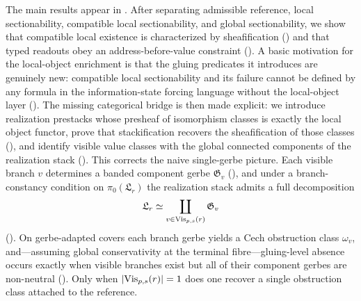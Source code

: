 The main results appear in . After separating admissible reference, local sectionability, compatible local sectionability, and global sectionability, we show that compatible local existence is characterized by sheafification () and that typed readouts obey an address-before-value constraint (). A basic motivation for the local-object enrichment is that the gluing predicates it introduces are genuinely new: compatible local sectionability and its failure cannot be defined by any formula in the information-state forcing language without the local-object layer (). The missing categorical bridge is then made explicit: we introduce realization prestacks whose presheaf of isomorphism classes is exactly the local object functor, prove that stackification recovers the sheafification of those classes (), and identify visible value classes with the global connected components of the realization stack (). This corrects the naive single-gerbe picture. Each visible branch $v$ determines a banded component gerbe $\mathfrak G_v$ (), and under a branch-constancy condition on $\pi_0(\mathfrak L_r)$ the realization stack admits a full decomposition
\[
\mathfrak L_r\simeq \coprod_{v\in \mathrm{Vis}_{p,s}(r)} \mathfrak G_v
\]
(). On gerbe-adapted covers each branch gerbe yields a Cech obstruction class $\omega_v$, and---assuming global conservativity at the terminal fibre---gluing-level absence occurs exactly when visible branches exist but all of their component gerbes are non-neutral (). Only when $|\mathrm{Vis}_{p,s}(r)|=1$ does one recover a single obstruction class attached to the reference.

